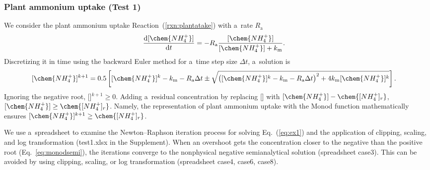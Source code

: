 \documentclass[gmdd, online, hvmath]{copernicus}
\begin{document}


\subsubsection*{Plant ammonium uptake (Test 1)}

      We consider the plant ammonium uptake Reaction~(\ref{rxn:plantatake})
      with a~rate $R_\mathrm{a}$
\begin{align}
 &
\frac{\mathrm{d} [\chem{NH_4^+}]}{\mathrm{d} t} =
- R_\mathrm{a} \frac{[\chem{NH_4^+}]}{[\chem{NH_4^+}]+k_\mathrm{m}}.
\label{eq:ex1}
\end{align}%
      Discretizing it in time using the backward Euler method for a~time
      step size $\Delta t$, a~solution is
\begin{align}
 &
[\chem{NH_4^+}]^{k+1} =
0.5 \left[
[\chem{NH_4^+}]^k - k_\mathrm{m} - R_\mathrm{a} \Delta t \pm \sqrt{\left([\chem{NH_4^+}]^k - k_\mathrm{m} - R_\mathrm{a}\Delta t\right)^2 + 4 k_\mathrm{m}[\chem{NH_4^+}]^k}
\right].
\label{eq:monodsemi}
\end{align}%
      Ignoring the negative root, []$^{k+1}\geq 0$. Adding
      a~residual concentration by replacing [] with
      $[\chem{NH_4^+}]-\chem{[NH_4^+]_r}$,
      $[\chem{NH_4^+}]\geq\chem{[NH_4^+]_r}$.  Namely, the representation of
      plant ammonium uptake with the Monod function mathematically ensures
      $[\chem{NH_4^+}]^{k+1} \geq \chem{[NH_4^+]_r}$.

      We use a~spreadsheet to examine the Newton--Raphson iteration process
      for solving Eq.~(\ref{eq:ex1}) and the application of clipping,
      scaling, and log transformation (test1.xlsx  in the Supplement). When an overshoot
      gets the concentration closer to the negative than the positive root
      (Eq.~\ref{eq:monodsemi}), the iterations converge to the nonphysical
      negative semianalytical solution (spreadsheet case3).  This can be
      avoided by using clipping, scaling, or log transformation (spreadsheet
      case4, case6, case8).
\end{document}
